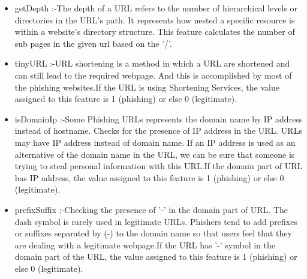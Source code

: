 \begin{itemize}
  \item getDepth :-{The depth of a URL refers to the number of hierarchical levels or directories in the URL's path. It represents how nested a specific resource is within a website's directory structure. This feature calculates the number of sub pages in the given url based on the '/'.}
  \item tinyURL :-{URL shortening is a method in which a URL are shortened and can still lead to the required webpage. And this is accomplished by most of the phishing websites.If the URL is using Shortening Services, the value assigned to this feature is 1 (phishing) or else 0 (legitimate).}
  \item isDomainIp :-{Some Phishing URLs represents the domain name by IP address instead of hostname. Checks for the presence of IP address in the URL. URLs may have IP address instead of domain name. If an IP address is used as an alternative of the domain name in the URL, we can be sure that someone is trying to steal personal information with this URL.If the domain part of URL has IP address, the value assigned to this feature is 1 (phishing) or else 0 (legitimate).}
  \item prefixSuffix :-{Checking the presence of '-' in the domain part of URL. The dash symbol is rarely used in legitimate URLs. Phishers tend to add prefixes or suffixes separated by (-) to the domain name so that users feel that they are dealing with a legitimate webpage.If the URL has '-' symbol in the domain part of the URL, the value assigned to this feature is 1 (phishing) or else 0 (legitimate).}
\end{itemize}

